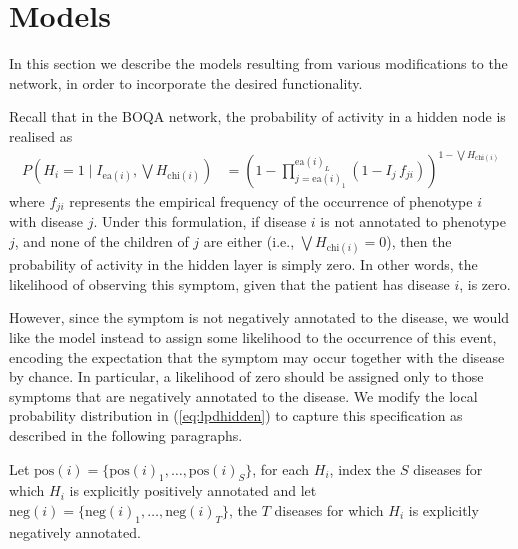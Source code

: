 \section{Models}
\label{sec:models}

In this section we describe the models resulting from various modifications to
the network, in order to incorporate the desired functionality.

Recall that in the BOQA network, the probability of activity in a hidden node is
realised as  
%
\begin{align}\label{eq:lpdhidden}
    P \left(H_i = 1 \mid I_{\text{ea}(i)}, \bigvee H_{\text{chi}(i)}\right)
    &= \left(
        1 - \prod_{j=\text{ea}(i)_1}^{\text{ea}(i)_L}
        \left(1 - I_j \, f_{ji}\right)
    \right)
    ^{1 - \bigvee H_{\text{chi}(i)}}
\end{align}
%
where $f_{ji}$ represents the empirical frequency of the occurrence of phenotype
$i$ with disease $j$.
%
Under this formulation, if disease $i$ is not annotated to phenotype $j$, 
and none of the children of $j$ are either (i.e., $\bigvee H_{\text{chi}(i)} = 0$),
then the probability of activity in the hidden layer is simply zero.
%
In other words, the likelihood of observing this symptom, given that the patient
has disease $i$, is zero.

However, since the symptom is not negatively annotated to the disease, we would
like the model instead to assign some likelihood to the occurrence of this event,
encoding the expectation that the symptom may occur together with the disease
by chance.
%
In particular, a likelihood of zero should be assigned only to those symptoms
that are negatively annotated to the disease.
%
We modify the local probability distribution in (\ref{eq:lpdhidden}) to capture
this specification as described in the following paragraphs.

Let $\text{pos}(i) = \{\text{pos}(i)_1, \hdots, \text{pos}(i)_S\}$, for each
$H_i$, index the $S$ diseases for which $H_i$ is explicitly positively
annotated and let $\text{neg}(i) = \{\text{neg}(i)_1, \hdots,
\text{neg}(i)_T\}$, the $T$ diseases for which $H_i$ is explicitly negatively
annotated.

